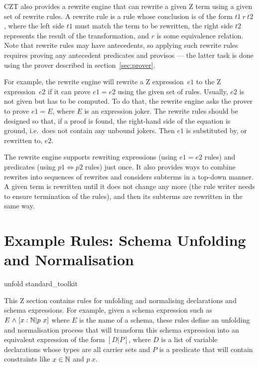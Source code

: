 \documentclass{entcs}
\begin{document}
CZT also provides a rewrite engine that can rewrite a given Z term
using a given set of rewrite rules.  A rewrite rule is a rule whose
conclusion is of the form $t1~r~t2$, where the left side $t1$ must
match the term to be rewritten, the right side $t2$ represents the
result of the transformation, and $r$ is some equivalence relation.
Note that rewrite rules may have antecedents, so applying such rewrite
rules requires proving any antecedent predicates and provisos --- the
latter task is done using the prover described in
section~\ref{sec:prover}.

For example, the rewrite engine will rewrite a Z expression~$e1$ to
the Z expression~$e2$ if it can prove $e1 = e2$ using the given set of
rules.  Usually, $e2$ is not given but has to be computed.  To do
that, the rewrite engine asks the prover to prove $e1 = E$, where $E$
is an expression joker.  The rewrite rules should be designed so that,
if a proof is found, the right-hand side of the equation is ground,
i.e.\ does not contain any unbound jokers.  Then $e1$ is substituted
by, or rewritten to, $e2$.

The rewrite engine supports rewriting expressions (using $e1 = e2$
rules) and predicates (using $p1 \iff p2$ rules) just once.  It also
provides ways to combine rewrites into sequences of rewrites and
considers subterms in a top-down manner.  A given term is rewritten
until it does not change any more (the rule writer needs to ensure
termination of the rules), and then its subterms are rewritten in the
same way.

\section{Example Rules: Schema Unfolding and Normalisation} \label{sec:schemas}

\begin{zsection}
  \SECTION unfold \parents standard\_toolkit
\end{zsection}

This Z section contains rules for unfolding and normalising declarations
and schema expressions.  For example, given a schema expression such as $E
\mathrel{\mathstrut{\wedge}} [x:{\mathbb N} | p~x]$ where $E$ is the name of a schema, these rules define
an unfolding and normalisation process that will transform this schema
expression into an equivalent expression of the form $[D|P]$, where $D$ is
a list of variable declarations whose types are all carrier sets and $P$ is
a predicate that will contain constraints like $x \in {\mathbb N}$ and $p~x$.
\end{document}
